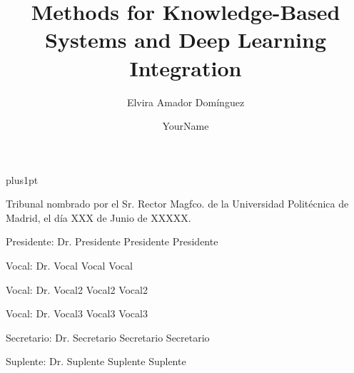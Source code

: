 \documentclass[twoside,11pt,table,xcdraw]{Latex/Classes/PhDthesisPSnPDF}
\title{Methods for Knowledge-Based Systems and Deep Learning Integration}
\author{{\hspace{7mm} Elvira Amador Domínguez}}
\author{YourName}
\begin{document}

\renewcommand\baselinestretch{1.2}
\baselineskip=18pt plus1pt

\theoremstyle{plain}
\newtheorem{thm}{Theorem}[chapter] %


\theoremstyle{definition}
\newtheorem{definition}[thm]{Definition} %

\newcommand{\attention}[1]{{\color{red}\textbf{#1}}}

\renewcommand\appendixname{ANNEX}


\frontmatter
\maketitle  %




\pagestyle{plain}
\cleardoublepage
\pagestyle{plain}


\noindent Tribunal nombrado por el Sr. Rector Magfco. de la Universidad Polit\'{e}cnica de
Madrid, el d\'{i}a XXX de Junio de XXXXX. %

\vspace{10mm}
Presidente:\hspace{0.3mm} Dr. Presidente Presidente Presidente

\vspace{5mm}
Vocal: \hspace{6.7mm} Dr. Vocal Vocal Vocal 

\vspace{5mm}
Vocal: \hspace{6.7mm} Dr. Vocal2 Vocal2 Vocal2

\vspace{5mm}
Vocal: \hspace{6.7mm} Dr. Vocal3 Vocal3 Vocal3

\vspace{5mm}
Secretario:\hspace{0.67mm} Dr. Secretario Secretario Secretario

\vspace{5mm}
Suplente: \hspace{1.5mm} Dr. Suplente Suplente Suplente   
\end{document}
